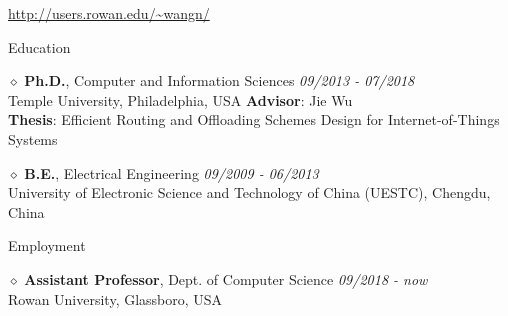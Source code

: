 \documentclass{resume} %
\begin{document}
\begin{center}
\vspace{-5pt}
\url{http://users.rowan.edu/~wangn/}

\end{center}

\begin{rSection}{Education}
\item $\diamond$ {\bf Ph.D.}, Computer and Information Sciences  \hfill {\textit{09/2013 - 07/2018}} \\ 
\hspace{-20em} Temple University, Philadelphia, USA \hfill {\bf Advisor}: Jie Wu \\
{\bf Thesis}: Efficient  Routing and Offloading Schemes Design for Internet-of-Things Systems  \\
\vspace{-15pt}
\item $\diamond$ {\bf B.E.}, Electrical Engineering \hfill {\textit{09/2009 - 06/2013}} \\ 
University of Electronic Science and Technology of China (UESTC), Chengdu, China\\

\end{rSection}


\begin{rSection}{Employment}
\item $\diamond$ {\bf Assistant Professor}, Dept. of Computer Science  \hfill {\textit{09/2018 - now}} \\ 
\hspace{-20em} Rowan University, Glassboro, USA 
\end{rSection}

\end{document}
